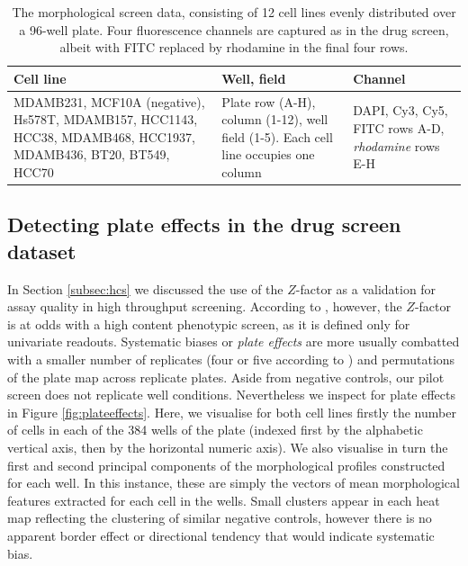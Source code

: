 \begin{table}
\begin{center}
\begin{tabular}{|p{5cm}|p{3cm}|p{3cm}|}
\hline
Cell line & Well, field & Channel \\
\hline
MDAMB231, MCF10A (negative), Hs578T, MDAMB157, HCC1143, HCC38, MDAMB468, HCC1937, MDAMB436, BT20, BT549, HCC70 & Plate row (A-H), column (1-12), well field (1-5). Each cell line occupies one column & DAPI, Cy3, Cy5, FITC rows A-D, \emph{rhodamine} rows E-H\\
\hline
\end{tabular}
\caption{The morphological screen data, consisting of 12 cell lines evenly distributed over a 96-well plate. Four fluorescence channels are captured as in the drug screen, albeit with FITC replaced by rhodamine in the final four rows.}
\label{table:morphscreen}
\end{center}
\end{table}

\subsection{Detecting plate effects in the drug screen dataset}

In Section \ref{subsec:hcs} we discussed the use of the $Z$-factor as a validation for assay quality in high throughput screening. According to \cite{singh2014increasing}, however, the $Z$-factor is at odds with a high content phenotypic screen, as it is defined only for univariate readouts. Systematic biases or \emph{plate effects} are more usually combatted with a smaller number of replicates (four or five according to \cite{bray2016cell}) and permutations of the plate map across replicate plates. Aside from negative controls, our pilot screen does not replicate well conditions. Nevertheless we inspect for plate effects in Figure \ref{fig:plateeffects}. Here, we visualise for both cell lines firstly the number of cells in each of the 384 wells of the plate (indexed first by the alphabetic vertical axis, then by the horizontal numeric axis). We also visualise in turn the first and second principal components of the morphological profiles constructed for each well. In this instance, these are simply the vectors of mean morphological features extracted for each cell in the wells. Small clusters appear in each heat map reflecting the clustering of similar negative controls, however there is no apparent border effect or directional tendency that would indicate systematic bias.


